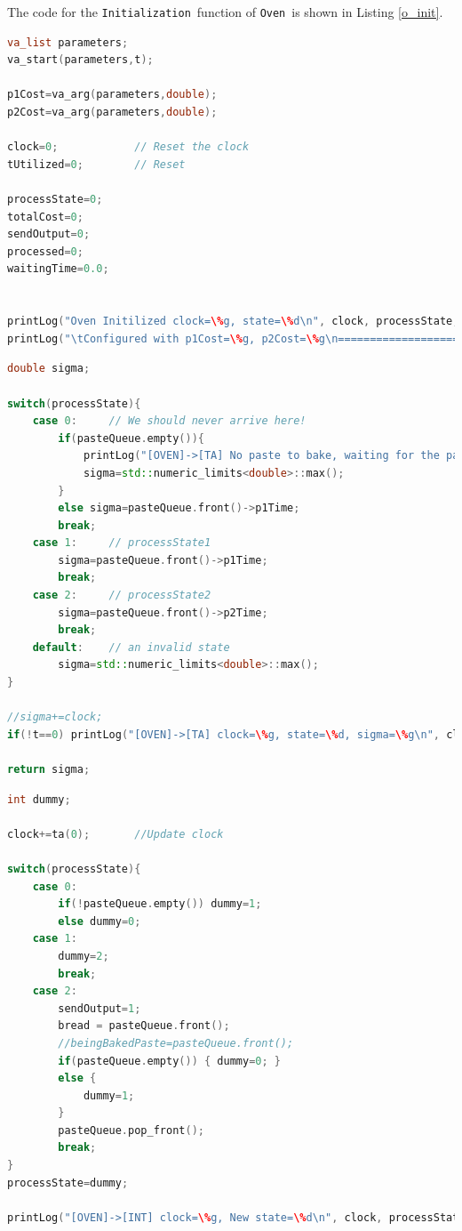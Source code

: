 \documentclass[titlepage]{report}%
\newcommand{\oven}{\texttt{Oven}~}
\newcommand{\init}{\texttt{Initialization}~}
\newcommand{\ta}{\texttt{Time Advance}~}
\newcommand{\intt}{\texttt{Internal Transition}~}
\begin{document}
{The code for the \init function of \oven is shown in Listing \ref{o_init}.

\begin{lstlisting}[caption={\init function for \oven}, language=c++, label={o_init}]
va_list parameters;
va_start(parameters,t);

p1Cost=va_arg(parameters,double);
p2Cost=va_arg(parameters,double);

clock=0;			// Reset the clock
tUtilized=0;		// Reset

processState=0;
totalCost=0;
sendOutput=0;
processed=0;
waitingTime=0.0;


printLog("Oven Initilized clock=\%g, state=\%d\n", clock, processState, t);
printLog("\tConfigured with p1Cost=\%g, p2Cost=\%g\n================================================\n\n", p1Cost, p2Cost);

\end{lstlisting}
\begin{lstlisting}[caption={\ta function for \oven}, language=c++, label={o_ta}]
double sigma;

switch(processState){
	case 0:		// We should never arrive here!
		if(pasteQueue.empty()){
			printLog("[OVEN]->[TA] No paste to bake, waiting for the paste INF (state=\%d)\n", processState);		
			sigma=std::numeric_limits<double>::max();
		}
		else sigma=pasteQueue.front()->p1Time;
		break;
	case 1:		// processState1
		sigma=pasteQueue.front()->p1Time;
		break;
	case 2:		// processState2
		sigma=pasteQueue.front()->p2Time;
		break;
	default:	// an invalid state
		sigma=std::numeric_limits<double>::max();
}

//sigma+=clock;
if(!t==0) printLog("[OVEN]->[TA] clock=\%g, state=\%d, sigma=\%g\n", clock, processState,sigma);

return sigma;
\end{lstlisting}

\begin{lstlisting}[caption={\intt function for \oven}, language=c++, label={o_ta}]
int dummy;

clock+=ta(0);		//Update clock

switch(processState){
	case 0:
		if(!pasteQueue.empty()) dummy=1;
		else dummy=0;
	case 1:
		dummy=2;
		break;
	case 2:
		sendOutput=1;	
		bread = pasteQueue.front();			
		//beingBakedPaste=pasteQueue.front();
		if(pasteQueue.empty()) { dummy=0; }
		else {
			dummy=1;			
		}
		pasteQueue.pop_front();
		break;	
}
processState=dummy;

printLog("[OVEN]->[INT] clock=\%g, New state=\%d\n", clock, processState);
\end{lstlisting}

}
\end{document}
